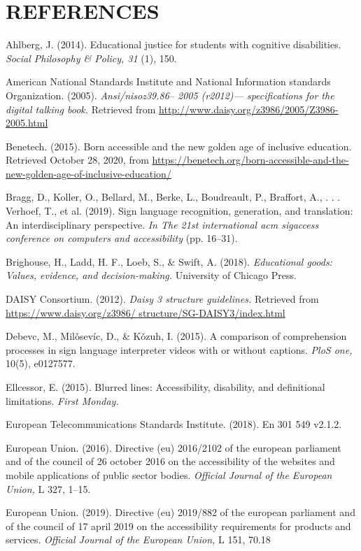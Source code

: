 \documentclass{sig-alternate} %
\begin{document}
\section*{REFERENCES}\par 

\leftskip 0.25in
\parindent -0.25in 

Ahlberg, J. (2014). Educational justice for students with cognitive disabilities. \textit{Social Philosophy \& Policy, 31} (1), 150.

American National Standards Institute and National Information standards Organization. (2005). \textit{Ansi/nisoz39.86– 2005 (r2012)— specifications for the digital talking book.} Retrieved from \url{http://www.daisy.org/z3986/2005/Z3986-2005.html}


Benetech. (2015). Born accessible and the new golden age of inclusive education. Retrieved October 28, 2020, from \url{https://benetech.org/born-accessible-and-the-new-golden-age-of-inclusive-education/}

Bragg, D., Koller, O., Bellard, M., Berke, L., Boudreault, P., Braffort, A., . . . Verhoef, T., et al. (2019). Sign language recognition, generation, and translation: An interdisciplinary perspective. \textit{In The 21st international acm sigaccess conference on computers and accessibility} (pp. 16–31).

Brighouse, H., Ladd, H. F., Loeb, S., \& Swift, A. (2018). \textit{Educational goods: Values, evidence, and decision-making.} University of Chicago Press.

DAISY Consortium. (2012). \textit{Daisy 3 structure guidelines.} Retrieved from \url{https://www.daisy.org/z3986/ structure/SG-DAISY3/index.html}

Debevc, M., Milǒsevíc, D., \& Kǒzuh, I. (2015). A comparison of comprehension processes in sign language interpreter videos with or without captions. \textit{PloS one,} 10(5), e0127577.

Ellcessor, E. (2015). Blurred lines: Accessibility, disability, and definitional limitations. \textit{First Monday.}

European Telecommunications Standards Institute. (2018). En 301 549 v2.1.2.

European Union. (2016). Directive (eu) 2016/2102 of the european parliament and of the council of 26 october 2016 on the accessibility of the websites and mobile applications of public sector bodies. \textit{Official Journal of the European Union,} L 327, 1–15.

European Union. (2019). Directive (eu) 2019/882 of the european parliament and of the council of 17 april 2019 on the accessibility requirements for products and services. \textit{Official Journal of the European Union,} L 151, 70.18
\end{document}
